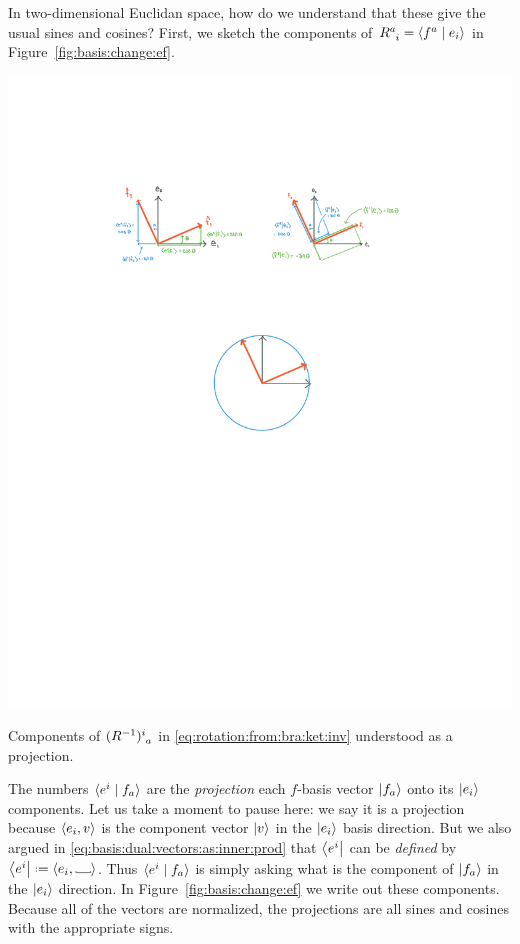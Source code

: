 \documentclass[12pt, oneside]{report}    %
\begin{document}
In two-dimensional Euclidan space, how do we understand that these give the usual sines and cosines? First, we sketch the components of $R\aij{a}{i} = \la f^a \mid e_i \ra$ in Figure~\ref{fig:basis:change:ef}.
\begin{marginfigure}%
    \includegraphics[width=\textwidth]{figures/basis_change_ef.pdf}
    \caption{Components of $(R\inv)\aij{i}{a}$ in \eqref{eq:rotation:from:bra:ket:inv} understood as a projection.}
    \label{fig:basis:change:ef}
\end{marginfigure}
The numbers $\langle e^i \mid f_a\rangle$ are the \emph{projection} each $f$-basis vector $\left|f_a\right\rangle$ onto its $\left|e_i\right\rangle$ components. Let us take a moment to pause here: we say it is a projection because $\langle e_i, v\rangle$ is the component vector $\left|v\right\rangle$ in the $\left|e_i\right\rangle$ basis direction. But we also argued in \eqref{eq:basis:dual:vectors:as:inner:prod} that $\left\langle e^i\right|$ can be \emph{defined} by $\bra{e^i} \defeq \la e_i , \Vtextvisiblespace[1em]{} \ra$. Thus $\langle e^i \mid f_a\rangle$ is simply asking what is the component of $\left|f_a\right\rangle$ in the $\left|e_i\right\rangle$ direction. In Figure~\ref{fig:basis:change:ef} we write out these components. Because all of the vectors are normalized, the projections are all sines and cosines with the appropriate signs.
\end{document}
